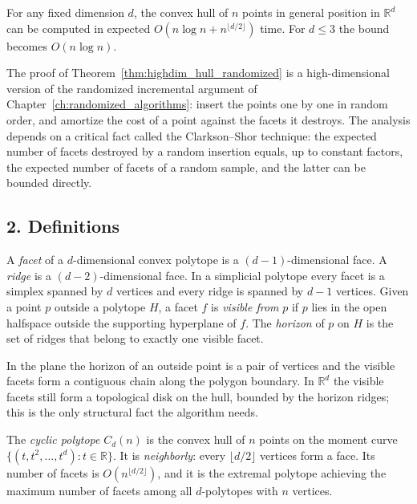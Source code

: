 \begin{theorem}
\label{thm:highdim_hull_randomized}
For any fixed dimension $d$, the convex hull of $n$ points in general position
in $\mathbb{R}^d$ can be computed in expected
$O(n \log n + n^{\lfloor d/2 \rfloor})$ time. For $d \le 3$ the bound becomes
$O(n \log n)$.
\end{theorem}

The proof of Theorem~\ref{thm:highdim_hull_randomized} is a high-dimensional
version of the randomized incremental argument of
Chapter~\ref{ch:randomized_algorithms}: insert the points one by one in random
order, and amortize the cost of a point against the facets it destroys. The
analysis depends on a critical fact called the Clarkson--Shor technique: the expected number of facets destroyed by
a random insertion equals, up to constant factors, the expected number of
facets of a random sample, and the latter can be bounded directly.

\subsection{2. Definitions}

\begin{definition}
\label{def:highdim_facet}
A \emph{facet} of a $d$-dimensional convex polytope is a
$(d-1)$-dimensional face. A \emph{ridge} is a $(d-2)$-dimensional face. In a
simplicial polytope every facet is a simplex spanned by $d$ vertices and every
ridge is spanned by $d-1$ vertices. Given a point $p$ outside a polytope
$H$, a facet $f$ is \emph{visible from} $p$ if $p$ lies in the open
halfspace outside the supporting hyperplane of $f$. The \emph{horizon} of $p$
on $H$ is the set of ridges that belong to exactly one visible facet.
\end{definition}

In the plane the horizon of an outside point is a pair of vertices and the
visible facets form a contiguous chain along the polygon boundary. In
$\mathbb{R}^d$ the visible facets still form a topological disk on the hull,
bounded by the horizon ridges; this is the only structural fact the algorithm
needs.

\begin{definition}
\label{def:highdim_cyclic}
The \emph{cyclic polytope} $C_d(n)$ is the convex hull
of $n$ points on the moment curve
$\{ (t, t^2, \dots, t^d) : t \in \mathbb{R} \}$. It is \emph{neighborly}:
every $\lfloor d/2 \rfloor$ vertices form a face. Its number of facets is
$O(n^{\lfloor d/2 \rfloor})$, and it is the extremal polytope achieving the
maximum number of facets among all $d$-polytopes with $n$ vertices.
\end{definition}

